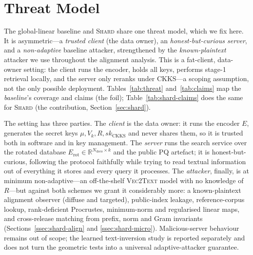 \documentclass[11pt,a4paper]{article}
\begin{document}
\section{Threat Model}\label{sec:threat}

The global-linear baseline and \textsc{Shard} share one threat model, which
we fix here. It is asymmetric---a \emph{trusted client} (the data owner), an
\emph{honest-but-curious server}, and a \emph{non-adaptive} baseline
attacker, strengthened by the \emph{known-plaintext} attacker we use
throughout the alignment analysis. This is a fat-client, data-owner setting:
the client runs the encoder, holds all keys, performs stage-1 retrieval
locally, and the server only reranks under CKKS---a scoping assumption, not
the only possible deployment. Tables~\ref{tab:threat} and~\ref{tab:claims}
map the \emph{baseline}'s coverage and claims (the foil);
Table~\ref{tab:shard-claims} does the same for \textsc{Shard} (the
contribution, Section~\ref{sec:shard}).

The setting has three parties. The \emph{client} is the data owner: it runs
the encoder $E$, generates the secret keys $\mu, V_k, R, sk_{\mathrm{CKKS}}$
and never shares them, so it is trusted both in software and in key
management. The \emph{server} runs the search service over the rotated
database $E_{\mathrm{rot}} \in \mathbb{R}^{N_{\mathrm{docs}} \times k}$ and the
public PQ artefact; it is honest-but-curious, following the protocol
faithfully while trying to read textual information out of everything it
stores and every query it processes. The \emph{attacker}, finally, is at
minimum non-adaptive---an off-the-shelf \textsc{Vec2Text} model with no
knowledge of $R$---but against both schemes we grant it considerably more: a
known-plaintext alignment observer (diffuse and targeted), public-index
leakage, reference-corpus lookup, rank-deficient Procrustes, minimum-norm and
regularised linear maps, and cross-release matching from prefix, norm and
Gram invariants (Sections~\ref{ssec:shard-align} and
\ref{ssec:shard-micro}). Malicious-server behaviour remains out of scope;
the learned text-inversion study is reported separately and does not turn the
geometric tests into a universal adaptive-attacker guarantee.
\end{document}
